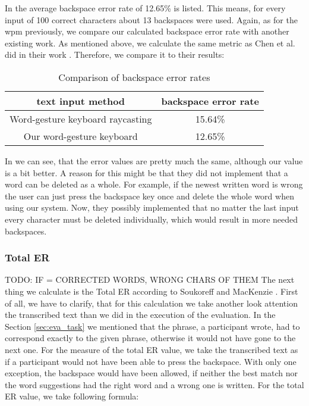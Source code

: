 In  the average backspace error rate of 12.65\% is listed. This means, for every input of 100 correct characters about 13 backspaces were used. Again, as for the wpm previously, we compare our calculated backspace error rate with another existing work. As mentioned above, we calculate the same metric as Chen et al. did in their work \cite{10.1145/3290607.3312762}. Therefore, we compare it to their results:
\begin{table}[H]
    \centering
    \caption{Comparison of backspace error rates}
    \begin{tabular}{cc} \toprule
        text input method&backspace error rate\\ \midrule
        Word-gesture keyboard raycasting&15.64\%\\
        Our word-gesture keyboard&12.65\%\\
        \bottomrule
    \end{tabular}
    \label{tab:error_backspace_compare}
\end{table}
In  we can see, that the error values are pretty much the same, although our value is a bit better. A reason for this might be that they did not implement that a word can be deleted as a whole. For example, if the newest written word is wrong the user can just press the backspace key once and delete the whole word when using our system. Now, they possibly implemented that no matter the last input every character must be deleted individually, which would result in more needed backspaces.

\subsubsection{Total ER} TODO: IF = CORRECTED WORDS, WRONG CHARS OF THEM
\label{sec:total_er}
The next thing we calculate is the Total ER according to Soukoreff and MacKenzie \cite{10.1145/642611.642632}. First of all, we have to clarify, that for this calculation we take another look attention the transcribed text than we did in the execution of the evaluation. In the Section \ref{sec:eva_task} we mentioned that the phrase, a participant wrote, had to correspond exactly to the given phrase, otherwise it would not have gone to the next one. For the measure of the total ER value, we take the transcribed text as if a participant would not have been able to press the backspace. With only one exception, the backspace would have been allowed, if neither the best match nor the word suggestions had the right word and a wrong one is written. For the total ER value, we take following formula:

